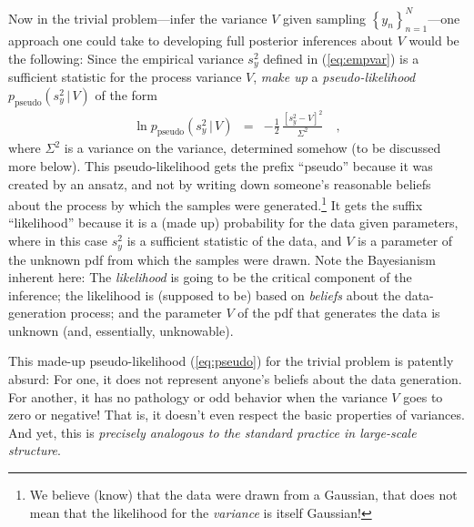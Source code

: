 \documentclass[12pt, letterpaper, preprint]{aastex}
\newcommand{\setof}[1]{\left\{{#1}\right\}}
\newcommand{\given}{\,|\,}
\newcommand{\pseudo}{{\mathrm{pseudo}}}
\begin{document}
Now in the trivial problem---infer the variance $V$ given sampling
$\setof{y_n}_{n=1}^N$---one approach one could take to developing full
posterior inferences about $V$ would be the following:
Since the empirical variance $s^2_y$ defined in (\ref{eq:empvar})
is a sufficient statistic for the process variance $V$, \emph{make up}
a \emph{pseudo-likelihood} $p_\pseudo(s^2_y\given V)$ of the form
\begin{eqnarray}
\ln p_\pseudo(s^2_y\given V) &=& -\frac{1}{2}\,\frac{[s^2_y - V]^2}{\Sigma^2}
\label{eq:pseudo}\quad ,
\end{eqnarray}
where $\Sigma^2$ is a variance on the variance, determined somehow (to
be discussed more below).
This pseudo-likelihood gets the prefix ``pseudo'' because it was
created by an ansatz, and not by writing down someone's reasonable
beliefs about the process by which the samples were
generated.\footnote{We believe (know) that the data were drawn from a
  Gaussian, that does not mean that the likelihood for the
  \emph{variance} is itself Gaussian!}
It gets the suffix ``likelihood'' because it is a (made up)
probability for the data given parameters, where in this case
$s^2_y$ is a sufficient statistic of the data, and $V$ is a
parameter of the unknown pdf from which the samples were drawn.
Note the Bayesianism inherent here:
The \emph{likelihood} is going to be the critical component of the
inference; the likelihood is (supposed to be) based on \emph{beliefs} about the
data-generation process; and the parameter $V$ of the pdf that
generates the data is unknown (and, essentially, unknowable).

This made-up pseudo-likelihood (\ref{eq:pseudo}) for the trivial
problem is patently absurd: For one, it does not represent anyone's
beliefs about the data generation.
For another, it has no pathology or odd behavior when the variance $V$
goes to zero or negative!
That is, it doesn't even respect the basic properties of variances.
And yet, this is \emph{precisely analogous to the standard practice in
  large-scale structure}.
\end{document}
